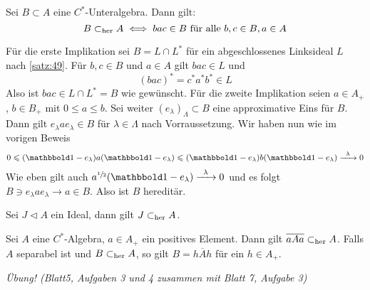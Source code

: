 \begin{satz}[{name=[Charakterisierung hereditär]}]
	Sei $B \subset A$ eine $C^*$-Unteralgebra. Dann gilt: 
	\[
		B \subset_{\operatorname{her}} A \iff bac \in B \text{ für alle } b,c \in B, a \in A 
	\]
\end{satz}
\begin{beweis}
	Für die erste Implikation sei $B = L \cap L^*$ für ein abgeschlossenes Linksideal $L$ nach \autoref{satz:49}. 
	Für $b,c \in B$ und $a \in A$ gilt $bac \in L$ und
	\[
		(bac)^* = c^*a^*b^* \in L
	\]
	Also ist $bac \in L \cap L^*=B$ wie gewünscht. 
	Für die zweite Implikation seien $a \in A_+$, $b \in B_+$ mit $0 \le a \le b$.
	Sei weiter $(e_\lambda)_\Lambda \subset B$ eine approximative Eins für $B$.
	Dann gilt $e_\lambda a e_\lambda \in B$ für $\lambda \in \Lambda$ nach Vorraussetzung.
	Wir haben nun wie im vorigen Beweis
	\[
		0 \le (\ind-e_\lambda)a(\ind - e_\lambda) \le (\ind -e_\lambda) b (\ind -e_\lambda) \grenzw{\lambda} 0
	\]
	Wie eben gilt auch $a^{\sfrac{1}{2}}(\ind -e_\lambda) \grenzw{\lambda} 0$ und  es folgt $B \ni e_\lambda a e_\lambda \to a \in B$.
	Also ist $B$ hereditär.
\end{beweis}

\begin{korollarB}[{name=[Ideale sind hereditär]}]
	Sei $J \lhd A$ ein Ideal, dann gilt $J \subset_{\operatorname{her}} A$. 
\end{korollarB}

\begin{korollar}[{name=[hereditäre Unteralgebren der Form $\overline{aAa}$]}]
	Sei $A$ eine $C^*$-Algebra, $a \in A_+$ ein positives Element. 
	Dann gilt $\overline{aAa} \subset_{\operatorname{her}} A$. 
	Falls $A$ separabel ist und $B \subset_{\operatorname{her}} A$, so gilt $B=\overline{hAh}$ für ein $h \in A_+$.
\end{korollar}
\begin{beweis}
	\emph{Übung! (Blatt5, Aufgaben 3 und 4 zusammen mit Blatt 7, Aufgabe 3)}
\end{beweis}

